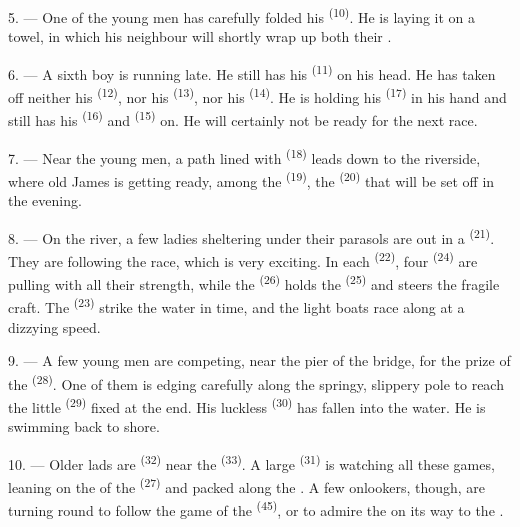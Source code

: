 5. --- One of the young men has carefully folded his  \textsuperscript{(10)}.
He is laying it on a towel, in which his neighbour will shortly wrap up both their
.

6. --- A sixth boy is running late. He still has his  \textsuperscript{(11)} on
his head. He has taken off neither his  \textsuperscript{(12)}, nor his
 \textsuperscript{(13)}, nor his
 \textsuperscript{(14)}. He is holding his 
\textsuperscript{(17)} in his hand and still has his  \textsuperscript{(16)}
and  \textsuperscript{(15)} on. He will certainly not be ready for the next
race.

7. --- Near the young men, a path lined with  \textsuperscript{(18)} leads
down to the riverside, where old James is getting ready, among the 
\textsuperscript{(19)}, the  \textsuperscript{(20)} that will be set off in
the evening.

\VUsaut{4.4mm}
\VUsaut{3.4mm}

8. --- On the river, a few ladies sheltering under their parasols are out in a
 \textsuperscript{(21)}. They are following the race, which is very
exciting. In each  \textsuperscript{(22)}, four 
\textsuperscript{(24)} are pulling with all their strength, while the
 \textsuperscript{(26)} holds the  \textsuperscript{(25)} and
steers the fragile craft. The  \textsuperscript{(23)} strike the water in time,
and the light boats race along at a dizzying speed.

9. --- A few young men are competing, near the pier of the bridge, for the prize of the
 \textsuperscript{(28)}. One of them is edging carefully along the
springy, slippery pole to reach the little
 \textsuperscript{(29)} fixed at the end. His luckless
 \textsuperscript{(30)} has fallen into the water. He is swimming back
to shore.

10. --- Older lads are  \textsuperscript{(32)} near the
 \textsuperscript{(33)}. A large  \textsuperscript{(31)} is
watching all these games, leaning on the  of the
 \textsuperscript{(27)} and packed along the . A few
onlookers, though, are turning round to follow the game of the
 \textsuperscript{(45)}, or to admire the
 on its way to the .

